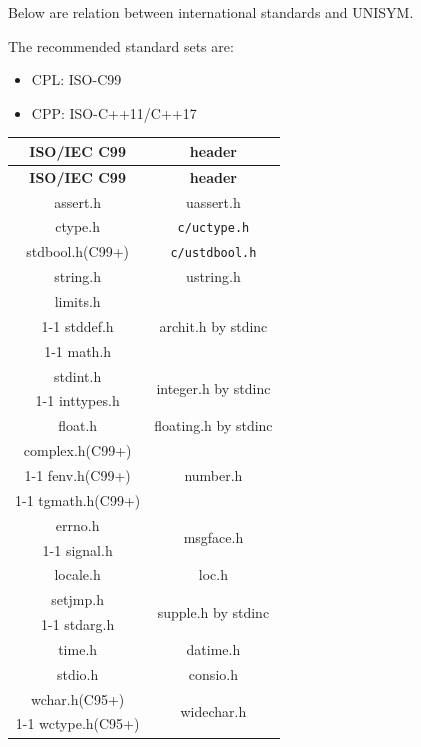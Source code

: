Below are relation between international standards and UNISYM.

The recommended standard sets are:

\begin{itemize}

\item CPL: ISO-C99
\item CPP: ISO-C++11/C++17
\end{itemize}

\begin{center}

\begin{longtable}{|c|c|}
\hline
\hline
\textbf{ISO/IEC C99\cite{StdC99}} & \textbf{header} \\
\hline\endfirsthead\hline
\textbf{ISO/IEC C99\cite{StdC99}} & \textbf{header} \\
\hline\endhead\hline\endfoot\hline\endlastfoot

assert.h & uassert.h \\
\hline
ctype.h & \verb|c/uctype.h| \\
\hline
stdbool.h(C99+) & \verb|c/ustdbool.h| \\
\hline
string.h & ustring.h \\
\hline
limits.h & \multirow{3}{*}{archit.h by stdinc} \\
\cline{1-1}
stddef.h &  \\
\cline{1-1}
math.h &  \\
\hline
stdint.h & \multirow{2}{*}{integer.h by stdinc} \\
\cline{1-1}
inttypes.h &  \\
\hline
float.h & floating.h by stdinc \\
\hline
complex.h(C99+) & \multirow{3}{*}{number.h} \\
\cline{1-1}
fenv.h(C99+) &  \\
\cline{1-1}
tgmath.h(C99+) &  \\
\hline
errno.h & \multirow{2}{*}{msgface.h} \\
\cline{1-1}
signal.h &  \\
\hline
locale.h & loc.h \\
\hline
setjmp.h & \multirow{2}{*}{supple.h by stdinc} \\
\cline{1-1}
stdarg.h &  \\
\hline
time.h & datime.h \\
\hline
stdio.h & consio.h \\
\hline
wchar.h(C95+) & \multirow{2}{*}{widechar.h} \\
\cline{1-1}
wctype.h(C95+) &  \\
\hline
\hline

\end{longtable}

\end{center}



